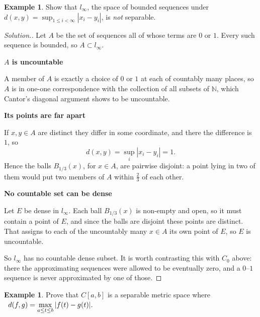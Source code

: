 \documentclass[11pt,a4paper]{article}
\theoremstyle{definition}
\newtheorem{exa}[thm]{Example}
\newenvironment{solution}
  {\renewcommand{\qedsymbol}{}\begin{proof}[\textit{Solution}.]}
  {\end{proof}}
\newcommand{\subhead}[1]{%
  \par\medskip\noindent\textbf{#1}\par\nobreak\smallskip}
\begin{document}
\begin{exa}
Show that $l_{\infty}$, the space of bounded sequences under $\displaystyle{d(x,y)=\sup_{1\leq i<\infty}|x_i-y_i|}$, is \emph{not} separable.
\end{exa}

\begin{solution}
Let $A$ be the set of sequences all of whose terms are $0$ or $1$. Every such sequence is bounded, so $A\subset l_{\infty}$.

\subhead{$A$ is uncountable}
A member of $A$ is exactly a choice of $0$ or $1$ at each of countably many places, so $A$ is in one-one correspondence with the collection of all subsets of $\mathbb{N}$, which Cantor's diagonal argument shows to be uncountable.

\subhead{Its points are far apart}
If $x,y\in A$ are distinct they differ in some coordinate, and there the difference is $1$, so
$$d(x,y)=\sup_i|x_i-y_i|=1 .$$
Hence the balls $B_{1/3}(x)$, for $x\in A$, are pairwise disjoint: a point lying in two of them would put two members of $A$ within $\frac{2}{3}$ of each other.

\subhead{No countable set can be dense}
Let $E$ be dense in $l_{\infty}$. Each ball $B_{1/3}(x)$ is non-empty and open, so it must contain a point of $E$, and since the balls are disjoint these points are distinct. That assigns to each of the uncountably many $x\in A$ its own point of $E$, so $E$ is uncountable.

So $l_{\infty}$ has no countable dense subset. It is worth contrasting this with $C_0$ above: there the approximating sequences were allowed to be eventually zero, and a $0$--$1$ sequence is never approximated by one of those.
\end{solution}



\begin{exa}
Prove that $C[a,b]$ is a separable metric space where $\hspace{0.2cm}\displaystyle{ d(f,g)=\max_{a\leq t\leq b}|f(t)-g(t)|}.$

\end{exa}
\end{document}
